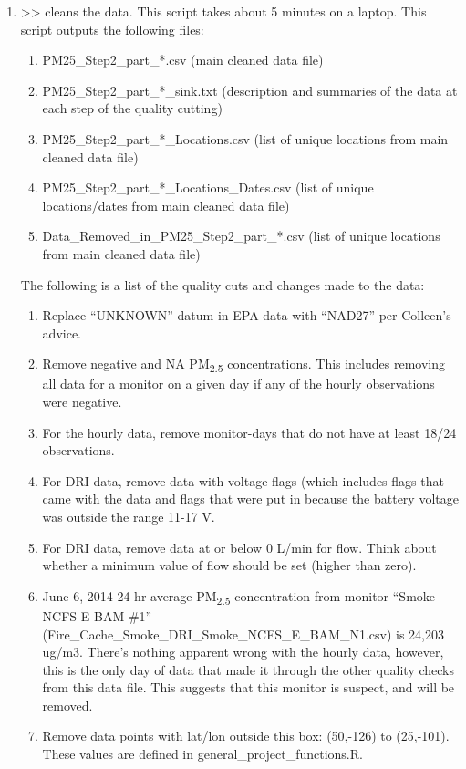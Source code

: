 \begin{enumerate}[nolistsep]
\item {} >> cleans the data. This script takes about 5 minutes on a laptop. This script outputs the following files: 
	\begin{enumerate}[nolistsep]
	\item PM25\_Step2\_part\_*.csv (main cleaned data file)
	\item PM25\_Step2\_part\_*\_sink.txt (description and summaries of the data at each step of the quality cutting)
	\item PM25\_Step2\_part\_*\_Locations.csv (list of unique locations from main cleaned data file)
	\item PM25\_Step2\_part\_*\_Locations\_Dates.csv (list of unique locations/dates from main cleaned data file)
	\item Data\_Removed\_in\_PM25\_Step2\_part\_*.csv (list of unique locations from main cleaned data file)
	\end{enumerate}
The following is a list of the quality cuts and changes made to the data:
	\begin{enumerate}[nolistsep]
	\item Replace ``UNKNOWN'' datum in EPA data with ``NAD27'' per Colleen's advice.
	\item Remove negative and NA PM\textsubscript{2.5} concentrations. This includes removing all data for a monitor on a given day if any of the hourly observations were negative.
	\item For the hourly data, remove monitor-days that do not have at least 18/24 observations.
	\item For DRI data, remove data with voltage flags (which includes flags that came with the data and flags that were put in because the battery voltage was outside the range 11-17 V.
	\item For DRI data, remove data at or below 0 L/min for flow. Think about whether a minimum value of flow should be set (higher than zero).
	\item June 6, 2014 24-hr average PM\textsubscript{2.5} concentration from monitor ``Smoke NCFS E-BAM \#1'' (Fire\_Cache\_Smoke\_DRI\_Smoke\_NCFS\_E\_BAM\_N1.csv) is 24,203 ug/m3. There's nothing apparent wrong with the hourly data, however, this is the only day of data that made it through the other quality checks from this data file. This suggests that this monitor is suspect, and will be removed.
	\item Remove data points with lat/lon outside this box: (50,-126) to (25,-101). These values are defined in general\_project\_functions.R. %

\end{enumerate}
\end{enumerate}
